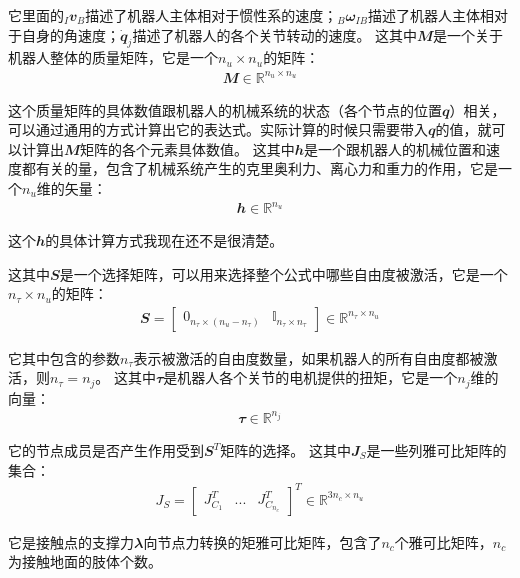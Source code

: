 它里面的$_I{\mathbfit v}_B$描述了机器人主体相对于惯性系的速度；$_B{\mathbfit \omega}_{IB}$描述了机器人主体相对于自身的角速度；$\dot {\mathbfit q}_j$描述了机器人的各个关节转动的速度。
这其中${\mathbfit M}$是一个关于机器人整体的质量矩阵，它是一个$n_u \times n_u$的矩阵： 
\begin{align}
    {\mathbfit M} \in {\mathbb R}^{n_u \times n_u}
\end{align}

这个质量矩阵的具体数值跟机器人的机械系统的状态（各个节点的位置${\mathbfit q}$）相关，可以通过通用的方式计算出它的表达式。实际计算的时候只需要带入${\mathbfit q}$的值，就可以计算出${\mathbfit M}$矩阵的各个元素具体数值。
这其中${\mathbfit h}$是一个跟机器人的机械位置和速度都有关的量，包含了机械系统产生的克里奥利力、离心力和重力的作用，它是一个$n_u$维的矢量：
\begin{align}
    {\mathbfit h} \in {\mathbb R}^{n_u}
\end{align}

\begin{note}
    这个${\mathbfit h}$的具体计算方式我现在还不是很清楚。
\end{note}

这其中${\mathbfit S}$是一个选择矩阵，可以用来选择整个公式中哪些自由度被激活，它是一个$n_{\tau} \times n_u$的矩阵：
\begin{align}
    {\mathbfit S} = \begin{bmatrix}{\mathbfit 0}_{n_{\tau} \times (n_u - n_{\tau})} & {\mathbb I}_{n_{\tau} \times n_{\tau}}\end{bmatrix} \in {\mathbb R}^{n_{\tau} \times n_u} 
\end{align}

它其中包含的参数$n_{\tau}$表示被激活的自由度数量，如果机器人的所有自由度都被激活，则$n_{\tau} = n_j$。
这其中${\mathbfit \tau}$是机器人各个关节的电机提供的扭矩，它是一个$n_j$维的向量：
\begin{align}
    {\mathbfit \tau} \in {\mathbb R}^{n_j} 
\end{align}

它的节点成员是否产生作用受到${\mathbfit S}^T$矩阵的选择。
这其中${\mathbfit J}_S$是一些列雅可比矩阵的集合：
\begin{align}
    J_S=\begin{bmatrix}J^T_{C_1} & ... & J^T_{C_{n_c}}\end{bmatrix}^T  \in {\mathbb R}^{3n_c\times n_u}
\end{align}

它是接触点的支撑力${\mathbfit \lambda}$向节点力转换的矩雅可比矩阵，包含了$n_c$个雅可比矩阵，$n_c$为接触地面的肢体个数。

